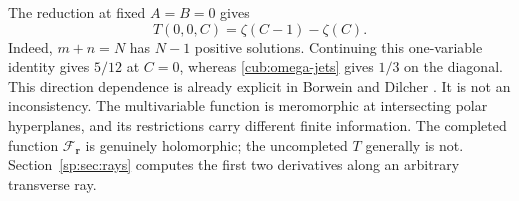 The reduction at fixed $A=B=0$ gives
\begin{equation}\label{cub:C-axis}
 T(0,0,C)=\zeta(C-1)-\zeta(C).
\end{equation}
Indeed, $m+n=N$ has $N-1$ positive solutions.  Continuing this
one-variable identity gives $5/12$ at $C=0$, whereas
\eqref{cub:omega-jets} gives $1/3$ on the diagonal.
This direction dependence is already explicit in
Borwein and Dilcher \cite[Theorem~2.7]{BorweinDilcher}.
It is not an inconsistency.  The multivariable function is meromorphic
at intersecting polar hyperplanes, and its restrictions carry different
finite information.  The completed function
$\mathcal F_{\boldsymbol r}$ is genuinely holomorphic; the uncompleted
$T$ generally is not.  Section~\ref{sp:sec:rays} computes the first two
derivatives along an arbitrary transverse ray.

